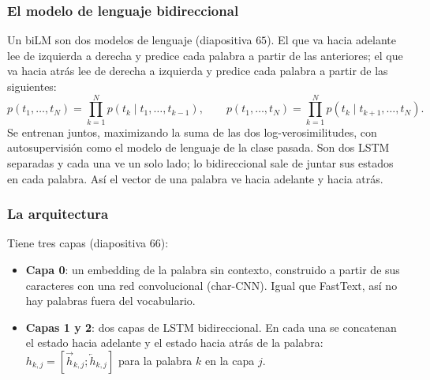 \documentclass[11pt,letterpaper]{article}
\begin{document}
\subsubsection*{El modelo de lenguaje bidireccional}

Un biLM son dos modelos de lenguaje (diapositiva $65$). El que va
hacia adelante lee de izquierda a derecha y predice cada palabra a
partir de las anteriores; el que va hacia atrás lee de derecha a
izquierda y predice cada palabra a partir de las siguientes:
\[
    p(t_1, \dots, t_N) = \prod_{k=1}^{N} p(t_k \mid t_1, \dots,
    t_{k-1}) ,
    \qquad
    p(t_1, \dots, t_N) = \prod_{k=1}^{N} p(t_k \mid t_{k+1}, \dots,
    t_N) .
\]
Se entrenan juntos, maximizando la suma de las dos log-verosimilitudes,
con autosupervisión como el modelo de lenguaje de la clase pasada. Son
dos LSTM separadas y cada una ve un solo lado; lo bidireccional sale de
juntar sus estados en cada palabra. Así el vector de una palabra ve
hacia adelante y hacia atrás.

\subsubsection*{La arquitectura}

Tiene tres capas (diapositiva $66$):

\begin{itemize}[itemsep=0.3em]
    \item \textbf{Capa 0}: un embedding de la palabra sin contexto,
          construido a partir de sus caracteres con una red
          convolucional (char-CNN). Igual que FastText, así no hay
          palabras fuera del vocabulario.
    \item \textbf{Capas 1 y 2}: dos capas de LSTM bidireccional. En
          cada una se concatenan el estado hacia adelante y el estado
          hacia atrás de la palabra:
          $h_{k,j} = [\overrightarrow{h}_{k,j};
          \overleftarrow{h}_{k,j}]$ para la palabra $k$ en la capa $j$.
\end{itemize}
\end{document}
